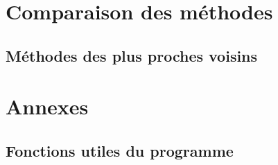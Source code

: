 \documentclass[11pt,a4paper]{article}
\begin{document}
\section{Comparaison des méthodes}
\label{comparaison}
\subsection{Méthodes des plus proches voisins}
%
%
%
%
%
%

\section{Annexes}
\subsection{Fonctions utiles du programme}

\newpage

\end{document}
